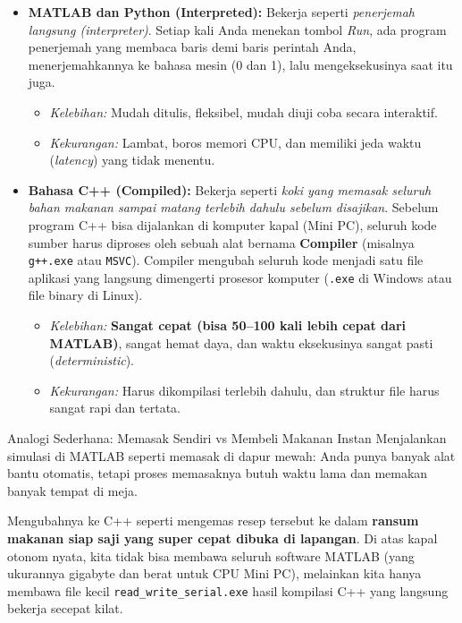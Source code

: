 \documentclass[11pt,a4paper]{article}
\begin{document}
\begin{itemize}[leftmargin=*]
    \item \textbf{MATLAB dan Python (Interpreted):}
    Bekerja seperti \textit{penerjemah langsung (interpreter)}. Setiap kali Anda menekan tombol \textit{Run}, ada program penerjemah yang membaca baris demi baris perintah Anda, menerjemahkannya ke bahasa mesin (0 dan 1), lalu mengeksekusinya saat itu juga. 
    \begin{itemize}
        \item \textit{Kelebihan:} Mudah ditulis, fleksibel, mudah diuji coba secara interaktif.
        \item \textit{Kekurangan:} Lambat, boros memori CPU, dan memiliki jeda waktu (\textit{latency}) yang tidak menentu.
    \end{itemize}

    \item \textbf{Bahasa C++ (Compiled):}
    Bekerja seperti \textit{koki yang memasak seluruh bahan makanan sampai matang terlebih dahulu sebelum disajikan}. Sebelum program C++ bisa dijalankan di komputer kapal (Mini PC), seluruh kode sumber harus diproses oleh sebuah alat bernama \textbf{Compiler} (misalnya \texttt{g++.exe} atau \texttt{MSVC}). Compiler mengubah seluruh kode menjadi satu file aplikasi yang langsung dimengerti prosesor komputer (\texttt{.exe} di Windows atau file binary di Linux).
    \begin{itemize}
        \item \textit{Kelebihan:} \textbf{Sangat cepat (bisa 50--100 kali lebih cepat dari MATLAB)}, sangat hemat daya, dan waktu eksekusinya sangat pasti (\textit{deterministic}).
        \item \textit{Kekurangan:} Harus dikompilasi terlebih dahulu, dan struktur file harus sangat rapi dan tertata.
    \end{itemize}
\end{itemize}

\begin{analogybox}{Analogi Sederhana: Memasak Sendiri vs Membeli Makanan Instan}
Menjalankan simulasi di MATLAB seperti memasak di dapur mewah: Anda punya banyak alat bantu otomatis, tetapi proses memasaknya butuh waktu lama dan memakan banyak tempat di meja. 

Mengubahnya ke C++ seperti mengemas resep tersebut ke dalam \textbf{ransum makanan siap saji yang super cepat dibuka di lapangan}. Di atas kapal otonom nyata, kita tidak bisa membawa seluruh software MATLAB (yang ukurannya gigabyte dan berat untuk CPU Mini PC), melainkan kita hanya membawa file kecil \texttt{read\_write\_serial.exe} hasil kompilasi C++ yang langsung bekerja secepat kilat.
\end{analogybox}
\end{document}
